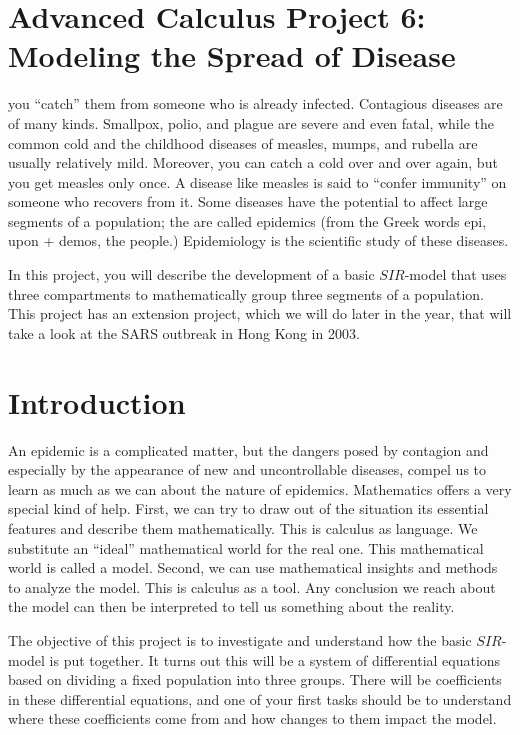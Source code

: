 \documentclass
[justified,nohyper]
{tufte-handout}
\begin{document}
\section{Advanced Calculus Project 6: Modeling the Spread of Disease}

 you ``catch'' them from someone 
who is already infected. Contagious diseases are of many kinds. Smallpox, polio, 
and plague are severe and even fatal, while the common cold and the childhood 
diseases of measles, mumps, and rubella are usually relatively mild. Moreover, you 
can catch a cold over and over again, but you get measles only once. A disease 
like measles is said to ``confer immunity'' on someone who recovers from it. Some 
diseases have the potential to affect large segments of a population; the are 
called epidemics (from the Greek words epi, upon + demos, the people.) 
Epidemiology is the scientific study of these diseases.

In this project, you will describe the development of a basic $SIR$-model that
uses three compartments to mathematically group three segments of a population.
This project has an extension project, which we will do later in the year, that
will take a look at the SARS outbreak in Hong Kong in 2003.

\section{Introduction}

An epidemic is a complicated matter, but the dangers posed by contagion and 
especially by the appearance of new and uncontrollable diseases, compel us to 
learn as much as we can about the nature of epidemics. Mathematics offers a very 
special kind of help. First, we can try to draw out of the situation its 
essential features and describe them mathematically. This is calculus as 
language. We substitute an ``ideal'' mathematical world for the real one. This 
mathematical world is called a model. Second, we can use mathematical insights 
and methods to analyze the model. This is calculus as a tool. Any conclusion we 
reach about the model can then be interpreted to tell us something about the 
reality.

The objective of this project is to investigate and understand how the basic 
$SIR$-model is put together. It turns out this will be a system of differential 
equations based on dividing a fixed population into three groups. There will be 
coefficients in these differential equations, and one of your first tasks should 
be to understand where these coefficients come from and how changes to them 
impact the model.
\end{document}
